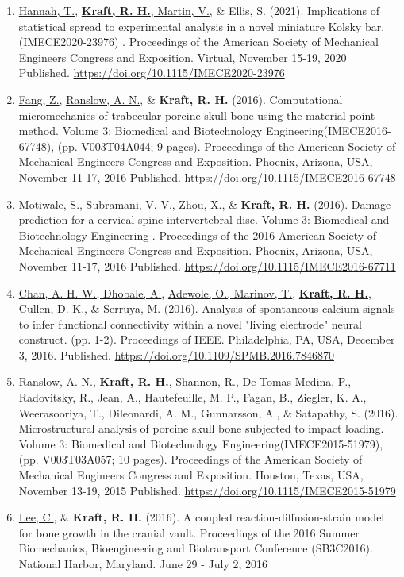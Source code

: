 \documentclass[a4paper,10pt]{article}
\begin{document}
\begin{enumerate}
\item \underline{Hannah, T.}, \underline{\textbf{\textbf{Kraft,} R. H.}, Martin, V.}, \& Ellis, S. (2021). Implications of statistical spread to experimental analysis in a novel miniature Kolsky bar.(IMECE2020-23976) . Proceedings of the American Society of Mechanical Engineers Congress and Exposition.  Virtual, November 15-19, 2020 Published. \url{https://doi.org/10.1115/IMECE2020-23976}
\item \underline{Fang, Z.}, \underline{Ranslow, A. N.}, \& \textbf{\textbf{Kraft,} R. H.} (2016). Computational micromechanics of trabecular porcine skull bone using the material point method. Volume 3: Biomedical and Biotechnology Engineering(IMECE2016-67748), (pp. V003T04A044; 9 pages). Proceedings of the American Society of Mechanical Engineers Congress and Exposition.  Phoenix, Arizona, USA, November 11-17, 2016 Published. \url{https://doi.org/10.1115/IMECE2016-67748}
\item \underline{Motiwale, S.}, \underline{Subramani, V. V.}, Zhou, X., \& \textbf{\textbf{Kraft,} R. H.} (2016). Damage prediction for a cervical spine intervertebral disc. Volume 3: Biomedical and Biotechnology Engineering . Proceedings of the 2016 American Society of Mechanical Engineers Congress and Exposition.  Phoenix, Arizona, USA, November 11-17, 2016 Published. \url{https://doi.org/10.1115/IMECE2016-67711}
\item \underline{Chan, A. H. W., Dhobale, A.}, \underline{Adewole, O., Marinov, T.}, \underline{\textbf{\textbf{Kraft,} R. H.}}, Cullen, D. K., \& Serruya, M. (2016). Analysis of spontaneous calcium signals to infer functional connectivity within a novel "living electrode" neural construct. (pp. 1-2). Proceedings of IEEE.  Philadelphia, PA, USA, December 3, 2016. Published. \url{https://doi.org/10.1109/SPMB.2016.7846870}
\item \underline{Ranslow, A. N.}, \underline{\textbf{\textbf{Kraft,} R. H.}, Shannon, R.}, \underline{De Tomas-Medina, P.}, Radovitsky, R., Jean, A., Hautefeuille, M. P., Fagan, B., Ziegler, K. A., Weerasooriya, T., Dileonardi, A. M., Gunnarsson, A., \& Satapathy, S. (2016). Microstructural analysis of porcine skull bone subjected to impact loading. Volume 3: Biomedical and Biotechnology Engineering(IMECE2015-51979), (pp. V003T03A057; 10 pages). Proceedings of the American Society of Mechanical Engineers Congress and Exposition.  Houston, Texas, USA, November 13-19, 2015 Published. \url{https://doi.org/10.1115/IMECE2015-51979}
\item \underline{Lee, C.}, \& \textbf{\textbf{Kraft,} R. H.} (2016). A coupled reaction-diffusion-strain model for bone growth in the cranial vault. Proceedings of the 2016 Summer Biomechanics, Bioengineering and Biotransport Conference (SB3C2016). National Harbor, Maryland. June 29 - July 2, 2016

\end{enumerate}
\end{document}
